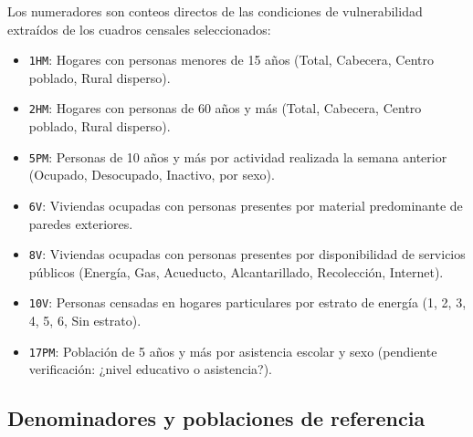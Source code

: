 Los numeradores son conteos directos de las condiciones de vulnerabilidad extraídos de los cuadros censales seleccionados:

\begin{itemize}
    \item \texttt{1HM}: Hogares con personas menores de 15 años (Total, Cabecera, Centro poblado, Rural disperso).
    \item \texttt{2HM}: Hogares con personas de 60 años y más (Total, Cabecera, Centro poblado, Rural disperso).
    \item \texttt{5PM}: Personas de 10 años y más por actividad realizada la semana anterior (Ocupado, Desocupado, Inactivo, por sexo).
    \item \texttt{6V}: Viviendas ocupadas con personas presentes por material predominante de paredes exteriores.
    \item \texttt{8V}: Viviendas ocupadas con personas presentes por disponibilidad de servicios públicos (Energía, Gas, Acueducto, Alcantarillado, Recolección, Internet).
    \item \texttt{10V}: Personas censadas en hogares particulares por estrato de energía (1, 2, 3, 4, 5, 6, Sin estrato).
    \item \texttt{17PM}: Población de 5 años y más por asistencia escolar y sexo (pendiente verificación: ¿nivel educativo o asistencia?).
\end{itemize}

\subsection{Denominadores y poblaciones de referencia}
\label{sec:denominadores}

